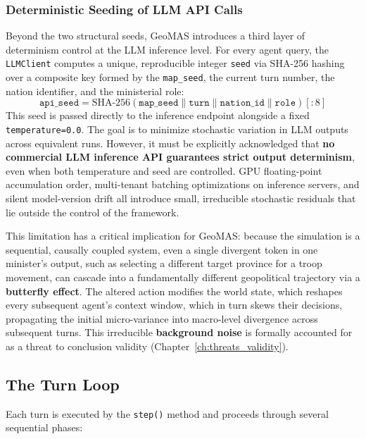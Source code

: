 \subsubsection{Deterministic Seeding of LLM API Calls}
\label{sec:llm_seeding}
Beyond the two structural seeds, GeoMAS introduces a third layer of determinism control at the LLM inference level. For every agent query, the \texttt{LLMClient} computes a unique, reproducible integer \texttt{seed} via SHA-256 hashing over a composite key formed by the \texttt{map\_seed}, the current turn number, the nation identifier, and the ministerial role:
\[
\texttt{api\_seed} = \text{SHA-256}(\texttt{map\_seed} \| \texttt{turn} \| \texttt{nation\_id} \| \texttt{role})[:8]
\]
This seed is passed directly to the inference endpoint alongside a fixed \texttt{temperature=0.0}. The goal is to minimize stochastic variation in LLM outputs across equivalent runs. However, it must be explicitly acknowledged that \textbf{no commercial LLM inference API guarantees strict output determinism}, even when both temperature and seed are controlled. GPU floating-point accumulation order, multi-tenant batching optimizations on inference servers, and silent model-version drift all introduce small, irreducible stochastic residuals that lie outside the control of the framework.

This limitation has a critical implication for GeoMAS: because the simulation is a sequential, causally coupled system, even a single divergent token in one minister's output, such as selecting a different target province for a troop movement, can cascade into a fundamentally different geopolitical trajectory via a \textbf{butterfly effect}. The altered action modifies the world state, which reshapes every subsequent agent's context window, which in turn skews their decisions, propagating the initial micro-variance into macro-level divergence across subsequent turns. This irreducible \textbf{background noise} is formally accounted for as a threat to conclusion validity (Chapter~\ref{ch:threats_validity}).

\subsection{The Turn Loop}
Each turn is executed by the \texttt{step()} method and proceeds through several sequential phases:

